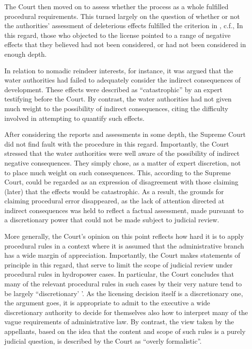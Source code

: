 The Court then moved on to assess whether the process as a whole fulfilled procedural requirements. This turned largely on the question of whether or not the authorities' assessment of deleterious effects fulfilled the criterion in \cite[8]{wra17}, c.f., \cite[16]{paa67} In this regard, those who objected to the license pointed to a range of negative effects that they believed had not been considered, or had not been considered in enough depth. 

In relation to nomadic reindeer interests, for instance, it was argued that the water authorities had failed to adequately consider the indirect consequences of development. These effects were described as ``catastrophic'' by an expert testifying before the Court. By contrast, the water authorities had not given much weight to the possibility of indirect consequences, citing the difficulty involved in attempting to quantify such effects.

After considering the reports and assessments in some depth, the Supreme Court did not find fault with the procedure in this regard. Importantly, the Court stressed that the water authorities were well aware of the possibility of indirect negative consequences. They simply chose, as a matter of expert discretion, not to place much weight on such consequences. This, according to the Supreme Court, could be regarded as an expression of disagreement with those claiming (later) that the effects would be catastrophic. As a result, the grounds for claiming procedural error disappeared, as the lack of attention directed at indirect consequences was held to reflect a factual assessment, made pursuant to a discretionary power that could not be made subject to judicial review.

More generally, the Court's opinion on this point reflects how hard it is to apply procedural rules in a context where it is assumed that the administrative branch has a wide margin of appreciation. Importantly, the Court makes statements of principle in this regard, that serve to limit the scope of judicial review under procedural rules in hydropower cases. In particular, the Court concludes that many of the relevant procedural rules in such cases by their very nature tend to be largely ``discretionary' '. As the licensing decision itself is a discretionary one, the argument goes, it is appropriate to admit to the executive a wide discretionary authority to decide for themselves also how to interpret many of the vague requirements of administrative law. By contrast, the view taken by the appellants, based on the idea that the content and scope of such rules is a purely judicial question, is described by the Court as ``overly formalistic''.

